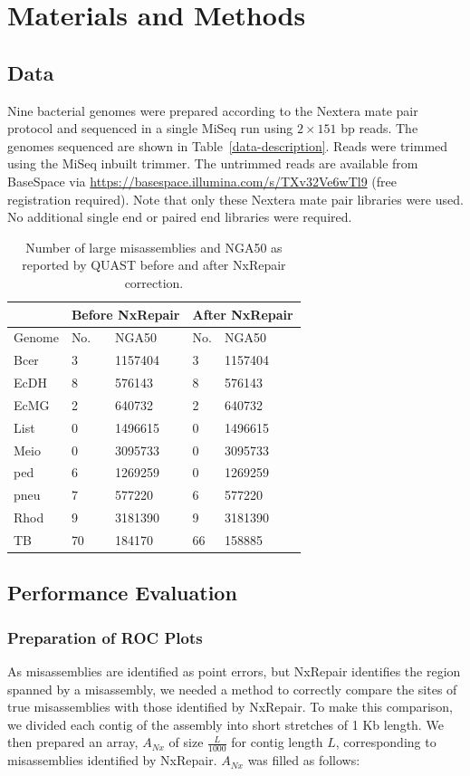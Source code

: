 \documentclass[fleqn,10pt]{wlpeerj}
\begin{document}
\section*{Materials and Methods}
\subsection*{Data}
Nine bacterial genomes were prepared according to the Nextera mate pair protocol and sequenced in a single MiSeq run using $2 \times 151$ bp reads. The genomes sequenced are shown in Table~\ref{data-description}. Reads were trimmed using the MiSeq inbuilt trimmer. The untrimmed reads are available from BaseSpace via \url{https://basespace.illumina.com/s/TXv32Ve6wTl9} (free registration required). Note that only these Nextera mate pair libraries were used. No additional single end or paired end libraries were required. 

\begin{table}[]
\begin{center}
{\begin{tabular}{lllllll}\hline
 & \multicolumn{2}{l}{Before NxRepair} & \multicolumn{4}{l}{After NxRepair} \\\hline
Genome & No. & NGA50 & No. & NGA50 \\\midrule
Bcer & 3 & 1157404 & 3 & 1157404 \\
EcDH & 8 & 576143 & 8 & 576143 \\
EcMG & 2 & 640732 & 2 & 640732 \\
List & 0 & 1496615 & 0 & 1496615 \\
Meio & 0 & 3095733 & 0 & 3095733 \\
ped & 6 & 1269259 & 0 & 1269259 \\
pneu & 7 & 577220 & 6 & 577220 \\
Rhod & 9 & 3181390 & 9 & 3181390 \\
TB & 70 & 184170 & 66 & 158885 \\\hline
\end{tabular}}{}
\end{center}
\caption{Number of large misassemblies and NGA50 as reported by QUAST before and after NxRepair correction. \label{tab:improvement}}
\end{table}  

\subsection*{Performance Evaluation}
\subsubsection*{Preparation of ROC Plots}
As misassemblies are identified as point errors, but NxRepair identifies the region spanned by a misassembly, we needed a method to correctly compare the sites of true misassemblies with those identified by NxRepair. To make this comparison, we divided each contig of the assembly into short stretches of 1 Kb length. We then prepared an array, $A_{Nx}$ of size $\frac{L}{1000}$ for contig length $L$, corresponding to misassemblies identified by NxRepair. $A_{Nx}$ was filled as follows:
\end{document}
